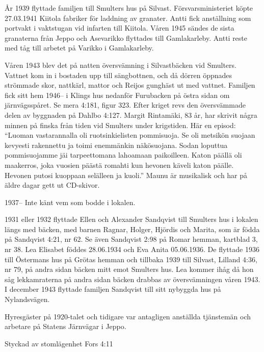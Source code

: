 År 1939 flyttade familjen till Smulters hus på Silvast. Försvarsministeriet köpte 27.03.1941 Kiitola fabriker för laddning av	granater. Antti fick anställning som portvakt i vaktstugan vid infarten till Kiitola. Våren 1945 sändes de sista granaterna från Jeppo och Asevarikko flyttades till Gamlakarleby. Antti reste med tåg till arbetet på Varikko i Gamlakarleby.

Våren 1943 blev det på natten översvämning i Silvastbäcken vid Smulters. Vattnet kom in i bostaden upp till sängbottnen, och då dörren öppnades strömmade skor, nattkärl, mattor och Reijos gunghäst ut med vattnet. Familjen fick sitt hem 1946-- i Klings hus nedanför Furubacken på östra sidan om 	järnvägsspåret. Se mera 4:181, figur 323. Efter kriget revs den översvämmade delen av byggnaden på Dahlbo 4:127. Margit Rintamäki, 83 år, har	skrivit några minnen på finska från tiden vid Smulters under krigstiden. Här en episod: ``Luoman vastarannalla oli ruotsinkielisten pommisuoja. Se oli metsikön suojaan kevyesti rakennettu ja toimi enemmänkin näkösuojana. Sodan loputtua pommisuojamme jäi tarpeettomana lahoamaan paikoilleen. Katon päällä oli maakerros, joka vuosien päästä romahti kun hevonen käveli katon päälle. Hevonen putosi kuoppaan selälleen ja kuoli.''  Maunu är musikalisk och har på äldre dagar gett ut CD-skivor.

1937-- Inte känt vem som bodde i lokalen.

1931 eller 1932 flyttade Ellen och Alexander Sandqvist till Smulters	hus i lokalen längs med bäcken, med barnen Ragnar, Holger, Hjördis	och Marita, som är födda på Sandqvist 4:21, nr 62. Se även Sandqvist	2:98 på Romar hemman, kartblad 3, nr 38. Lea Elisabet föddes 28.06.1934 och Eva Anita 05.06.1936. De flyttade 1936 till Östermans hus på Grötas hemman och	tillbaka 1939 till Silvast, Lilland 4:36, nr 79, på andra sidan bäcken mitt emot Smulters hus. Lea kommer ihåg då hon såg lekkamraterna på andra sidan bäcken drabbas av översvämningen våren 1943. I december 1943 flyttade familjen Sandqvist till sitt nybyggda hus på Nylandsvägen.

Hyresgäster på 1920-talet och tidigare var antagligen anställda tjänstemän och arbetare på Statens Järnvägar i Jeppo.



%

Styckad av stomlägenhet Fors 4:11


